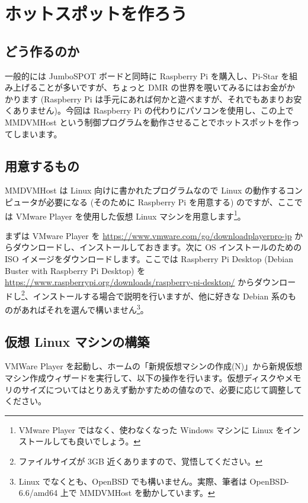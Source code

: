 \documentclass[a4j,oneside]{ujbook}
\begin{document}
\chapter{ホットスポットを作ろう}

\section{どう作るのか}

一般的には JumboSPOT ボードと同時に Raspberry Pi を購入し、Pi-Star を組み上げることが多いですが、ちょっと DMR の世界を覗いてみるにはお金がかかります (Raspberry Pi は手元にあれば何かと遊べますが、それでもあまりお安くありません)。今回は Raspberry Pi の代わりにパソコンを使用し、この上で MMDVMHost という制御プログラムを動作させることでホットスポットを作ってしまいます。

\section{用意するもの}

MMDVMHost は Linux 向けに書かれたプログラムなので Linux の動作するコンピュータが必要になる (そのために Raspberry Pi を用意する) のですが、ここでは VMware Player を使用した仮想 Linux マシンを用意します\footnote{VMware Player ではなく、使わなくなった Windows マシンに Linux をインストールしても良いでしょう。}。

まずは VMware Player を \url{https://www.vmware.com/go/downloadplayerpro-jp} からダウンロードし、インストールしておきます。次に OS インストールのための ISO イメージをダウンロードします。ここでは Raspberry Pi Desktop (Debian Buster with Raspberry Pi Desktop) を \url{https://www.raspberrypi.org/downloads/raspberry-pi-desktop/} からダウンロードし\footnote{ファイルサイズが 3GB 近くありますので、覚悟してください。}、インストールする場合で説明を行いますが、他に好きな Debian 系のものがあればそれを選んで構いません\footnote{Linux でなくとも、OpenBSD でも構いません。実際、筆者は OpenBSD-6.6/amd64 上で MMDVMHost を動かしています。}。

\section{仮想 Linux マシンの構築}

VMWare Player を起動し、ホームの「新規仮想マシンの作成(N)」から新規仮想マシン作成ウィザードを実行して、以下の操作を行います。仮想ディスクやメモリのサイズについてはとりあえず動かすための値なので、必要に応じて調整してください。
\end{document}

